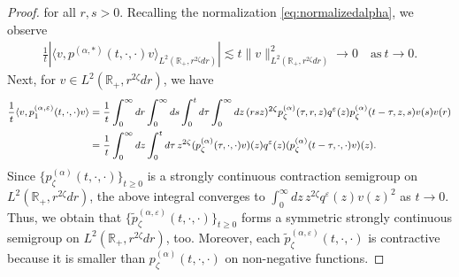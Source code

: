 \documentclass[12pt,reqno]{amsart}
\theoremstyle{definition}
\theoremstyle{remark}
\numberwithin{equation}{section}
\newcommand{\1}{\mathbbm{1}}
\renewcommand{\epsilon}{\varepsilon}
\newcommand{\R}{\mathbb{R}}
\begin{document}
\begin{proof}
  for all $r,s>0$.
  Recalling the normalization \eqref{eq:normalizedalpha}, we observe
  \begin{align}
    \frac1t |\langle v,p^{(\alpha,*)}(t,\cdot,\cdot)v\rangle_{L^2(\R_+,r^{2\zeta}dr)}|
    \lesssim t \|v\|_{L^2(\R_+,r^{2\zeta}dr)}^2 \to0 \quad \text{as}\ t\to0.
  \end{align}
  Next, for $v\in L^2(\R_+,r^{2\zeta}dr)$, we
  have
  \begin{align}
    \footnotesize
    \begin{split}
      \frac1t\langle v,p_1^{(\alpha,\epsilon)}(t,\cdot,\cdot)v\rangle
      & = \frac1t\int_0^\infty dr\int_0^\infty ds \int_0^t d\tau \int_0^\infty dz\, (rsz)^{2\zeta} p_\zeta^{(\alpha)}(\tau,r,z) q^\epsilon(z) p_\zeta^{(\alpha)}(t-\tau,z,s) v(s)v(r) \\
      & = \frac1t \int_0^\infty dz \int_0^t d\tau\, z^{2\zeta} (p_\zeta^{(\alpha)}(\tau,\cdot,\cdot)v)(z) q^\epsilon(z) (p_\zeta^{(\alpha)}(t-\tau,\cdot,\cdot)v)(z).
    \end{split}
  \end{align}
  Since $\{p_\zeta^{(\alpha)}(t,\cdot,\cdot)\}_{t\geq0}$ is a strongly continuous contraction semigroup on $L^2(\R_+,r^{2\zeta}dr)$, the above integral converges to $\int_0^\infty dz\, z^{2\zeta}q^\epsilon(z) v(z)^2$ as $t\to0$. Thus, we obtain that $\{\tilde p_{\zeta}^{(\alpha,\epsilon)}(t,\cdot,\cdot)\}_{t\geq0}$ forms a symmetric strongly continuous semigroup on $L^2(\R_+,r^{2\zeta}dr)$, too. Moreover, each $\tilde p_\zeta^{(\alpha,\epsilon)}(t,\cdot,\cdot)$ is contractive because it is smaller than $p_\zeta^{(\alpha)}(t,\cdot,\cdot)$ on non-negative functions.
  

\end{proof}
\end{document}
